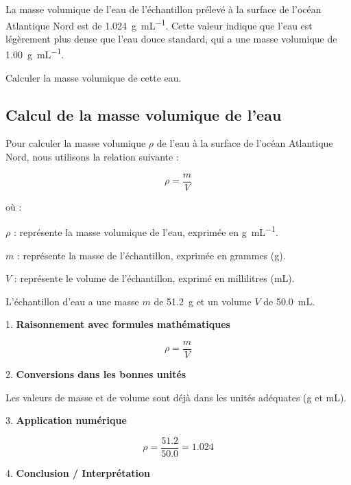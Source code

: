 \documentclass[answers]{exam}
\begin{document}
\begin{questions}
\begin{solution}
La masse volumique de l'eau de l'échantillon prélevé à la surface de l'océan Atlantique Nord est de \SI{1.024}{\gram\per\milli\liter}. Cette valeur indique que l'eau est légèrement plus dense que l'eau douce standard, qui a une masse volumique de \SI{1.00}{\gram\per\milli\liter}.
\end{solution}

\question[4] Calculer la masse volumique de cette eau.
  
  

\begin{solution}

\subsection*{Calcul de la masse volumique de l'eau}

Pour calculer la masse volumique $\rho$ de l'eau à la surface de l'océan Atlantique Nord, nous utilisons la relation suivante :

\[
\rho = \frac{m}{V}
\]

où :

\begin{addmargin}[4em]{1em}
  \begin{compactitem}
    \item [$\rho$] : représente la masse volumique de l'eau, exprimée en \si{\gram\per\milli\liter}.
    \item [$m$] : représente la masse de l'échantillon, exprimée en grammes (\si{\gram}).
    \item [$V$] : représente le volume de l'échantillon, exprimé en millilitres (\si{\milli\liter}).
  \end{compactitem}
\end{addmargin}

L'échantillon d'eau a une masse $m$ de \SI{51.2}{\gram} et un volume $V$ de \SI{50.0}{\milli\liter}. 

1. \textbf{Raisonnement avec formules mathématiques}

\[
\rho = \frac{m}{V}
\]

2. \textbf{Conversions dans les bonnes unités}

Les valeurs de masse et de volume sont déjà dans les unités adéquates (\si{\gram} et \si{\milli\liter}).

3. \textbf{Application numérique}

\[
\rho = \frac{51.2}{50.0} = 1.024
\]

4. \textbf{Conclusion / Interprétation}


\end{solution}
\end{questions}
\end{document}
